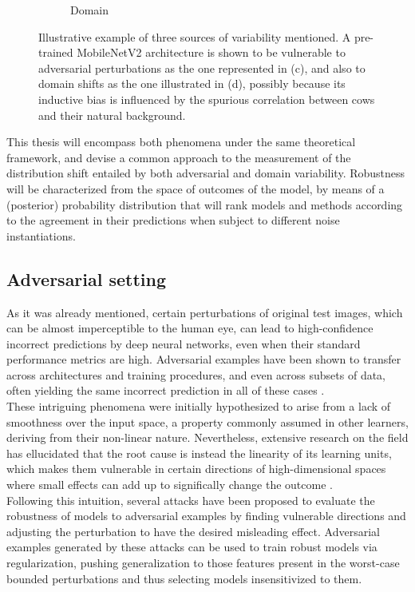 \begin{figure}[H]
\begin{subfigure}[b]{0.22\textwidth}
        \caption{Domain}
    \end{subfigure}
       \caption{Illustrative example of three sources of variability
       mentioned. A pre-trained MobileNetV2 
       architecture is shown to be vulnerable to adversarial perturbations 
       as the one represented in (c), and also to domain shifts 
       as the one illustrated in (d), possibly because its inductive bias is influenced
       by the spurious correlation between cows and their natural background.}
       \label{fig:cows}
\end{figure}

This thesis will encompass both phenomena under the same theoretical
framework, and devise a common approach to the measurement of
the distribution shift entailed by both adversarial and domain
variability. Robustness will be characterized from the space of
outcomes of the model, by means of a (posterior) probability 
distribution that will rank models and methods according to the
agreement in their predictions when subject to different noise instantiations.

\subsection{Adversarial setting}

As it was already mentioned, certain perturbations of
original test images, which can be almost imperceptible
to the human eye, can lead to high-confidence
incorrect predictions by deep neural networks, even when their
standard performance metrics are high.
Adversarial examples have been shown to transfer
across architectures and training procedures, and
even across subsets of data,
often yielding the same incorrect prediction in
all of these cases \cite{szegedyIntriguingPropertiesNeural2014}. \\

These intriguing phenomena were initially hypothesized to arise 
from a lack of smoothness over the input space, a property
commonly assumed in other learners, deriving from their
non-linear nature. Nevertheless,
extensive research on the field has ellucidated that the root
cause is instead the linearity of its learning units, which makes them
vulnerable in certain directions of high-dimensional
spaces where small
effects can add up to significally change the outcome
\cite{goodfellowExplainingHarnessingAdversarial2015}. \\

Following this intuition, several attacks have been proposed
to evaluate the robustness of models to adversarial examples by
finding vulnerable directions and adjusting the perturbation to have
the desired misleading effect.  Adversarial examples generated
by these attacks can be used to train robust models via regularization,
pushing generalization to those features present in the worst-case
bounded perturbations and thus selecting models insensitivized
to them. \\

